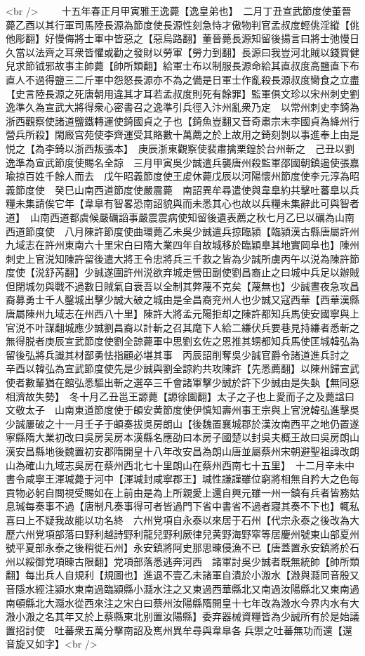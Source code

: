 <br />
　　十五年春正月甲寅雅王逸薨【逸皇弟也】　二月丁丑宣武節度使董晉薨乙酉以其行軍司馬陸長源為節度使長源性刻急恃才傲物判官孟叔度輕佻淫縱【佻他彫翻】好慢侮將士軍中皆惡之【惡烏路翻】董晉薨長源知留後揚言曰將士弛慢日久當以法齊之耳衆皆懼或勸之發財以勞軍【勞力到翻】長源曰我豈河北賊以錢買健兒求節钺邪故事主帥薨【帥所類翻】給軍士布以制服長源命給其直叔度高鹽直下布直人不過得鹽三二斤軍中怨怒長源亦不為之備是日軍士作亂殺長源叔度臠食之立盡【史言陸長源之死唐朝用違其才耳若孟叔度則死有餘罪】監軍俱文珍以宋州刺史劉逸準久為宣武大將得衆心密書召之逸準引兵徑入汴州亂衆乃定　以常州刺史李錡為浙西觀察使諸道鹽鐵轉運使錡國貞之子也【錡魚豈翻又音奇肅宗末李國貞為絳州行營兵所殺】閑廄宫苑使李齊運受其賂數十萬薦之於上故用之錡刻剝以事進奉上由是悦之【為李錡以浙西叛張本】　庚辰浙東觀察使裴肅擒栗鍠於台州斬之　己丑以劉逸準為宣武節度使賜名全諒　三月甲寅吳少誠遣兵襲唐州殺監軍邵國朝鎮遏使張嘉瑜掠百姓千餘人而去　戊午昭義節度使王䖍休薨戊辰以河陽懷州節度使李元淳為昭義節度使　癸巳山南西道節度使嚴震薨　南詔異牟尋遣使與韋臯約共擊吐蕃臯以兵糧未集請俟它年【韋臯有智畧恐南詔貌與而未悉其心也故以兵糧未集辭此可與智者道】　山南西道都虞候嚴礪謟事嚴震震病使知留後遺表薦之秋七月乙巳以礪為山南西道節度使　八月陳許節度使曲環薨乙未吳少誠遣兵掠臨潁【臨潁漢古縣唐屬許州九域志在許州東南六十里宋白曰隋大業四年自故城移於臨穎臯其地實岡阜也】陳州刺史上官涚知陳許留後遣大將王令忠將兵三千救之皆為少誠所虜丙午以涚為陳許節度使【涚舒芮翻】少誠遂圍許州涚欲弃城走營田副使劉昌裔止之曰城中兵足以辦賊但閉城勿與戰不過數日賊氣自衰吾以全制其弊蔑不克矣【蔑無也】少誠晝夜急攻昌裔募勇士千人鑿城出擊少誠大破之城由是全昌裔兖州人也少誠又寇西華【西華漢縣唐屬陳州九域志在州西八十里】陳許大將孟元陽拒却之陳許都知兵馬使安國寧與上官涚不叶謀翻城應少誠劉昌裔以計斬之召其麾下人給二縑伏兵要巷見持縑者悉斬之無得脱者庚辰宣武節度使劉全諒薨軍中思劉玄佐之恩推其甥都知兵馬使匡城韓弘為留後弘將兵識其材鄙勇怯指顧必堪其事　丙辰詔削奪吳少誠官爵令諸道進兵討之　辛酉以韓弘為宣武節度使先是少誠與劉全諒約共攻陳許【先悉薦翻】以陳州歸宣武使者數輩猶在館弘悉驅出斬之選卒三千會諸軍擊少誠於許下少誠由是失埶【無同惡相濟故失勢】　冬十月乙丑邕王謜薨【謜徐園翻】太子之子也上愛而子之及薨諡曰文敬太子　山南東道節度使于頔安黄節度使伊慎知壽州事王宗與上官涗韓弘進擊吳少誠屢破之十一月壬子于頔奏拔吳房朗山【後魏置襄城郡於漢汝南西平之地仍置遂寧縣隋大業初改曰吳房吴房本漢縣名應劭曰本房子國楚以封吳夫概王故曰吳房朗山漢安昌縣地後魏置初安郡隋開皇十八年改安昌為朗山唐並屬蔡州宋朝避聖祖諱改朗山為確山九域志吳房在蔡州西北七十里朗山在蔡州西南七十五里】　十二月辛未中書令咸寧王渾瑊薨于河中【渾瑊封咸寧郡王】瑊性謙謹雖位窮將相無自矜大之色每貢物必躬自閲視受賜如在上前由是為上所親愛上還自興元雖一州一鎮有兵者皆務姑息瑊每奏事不過【唐制凡奏事得可者皆過門下省中書省不過者寢其奏不下也】輒私喜曰上不疑我故能以功名終　六州党項自永泰以來居于石州【代宗永泰之後改為大歷六州党項部落曰野利越詩野利龍兒野利厥律兒黄野海野窣等居慶州號東山部夏州號平夏部永泰之後稍徙石州】永安鎮將阿史那思暕侵漁不已【唐蓋置永安鎮將於石州以綏御党項暕古限翻】党項部落悉逃奔河西　諸軍討吳少誠者既無統帥【帥所類翻】每出兵人自規利【規圖也】進退不壹乙未諸軍自潰於小溵水【溵與㶏同音殷又音隱水經注潁水東南過臨潁縣小㶏水注之又東過西華縣北又南過汝陽縣北又東南過南頓縣北大㶏水從西來注之宋白曰蔡州汝陽縣隋開皇十七年改為溵水今界内水有大溵小溵之名其年又於上蔡縣東北别置汝陽縣】委弃器械資糧皆為少誠所有於是始議置招討使　吐蕃衆五萬分擊南詔及嶲州異牟尋與韋臯各兵禦之吐蕃無功而還【還音旋又如字】<br />
